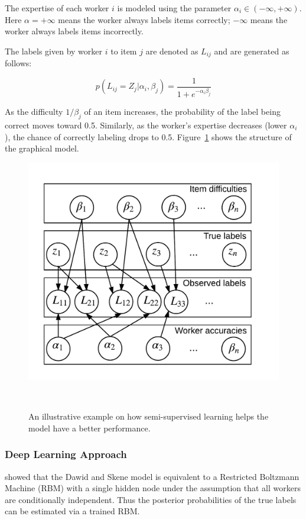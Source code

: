 \documentclass{article}
\begin{document}
The expertise of each worker $i$ is modeled using the parameter
$\alpha_i \in (-\infty, +\infty)$. Here $\alpha = +\infty$ means the
worker always labels items correctly; $-\infty$ means the worker
always labels items incorrectly.

The labels given by worker $i$ to item $j$ are denoted as $L_{ij}$
and are generated as follows:

\begin{equation} \label{eq:glad_label}
  p(L_{ij}=Z_j|\alpha_i , \beta_j) = \frac{1}{1+e^{-\alpha_i \beta_j}}
\end{equation}

As the difficulty $1/\beta_j$ of an item increases, the probability of
the label being correct moves toward 0.5. Similarly, as the worker's
expertise decreases (lower $\alpha_i$), the chance of correctly
labeling drops to 0.5. Figure~\ref{fg:glad_model} shows the structure
of the graphical model.

\begin{figure}[h]
  \centering
  \includegraphics[width=0.95\columnwidth]{glad.png}
  \caption{An illustrative example on how semi-supervised learning helps
    the model have a better performance.}~\label{fg:glad_model}
\end{figure}

\subsubsection{Deep Learning Approach}
\cite{Shaham2016-nh} showed that the Dawid and Skene model is
equivalent to a Restricted Boltzmann Machine (RBM) with a single
hidden node under the assumption that all workers are conditionally
independent. Thus the posterior probabilities of the true labels can
be estimated via a trained RBM.
\end{document}
